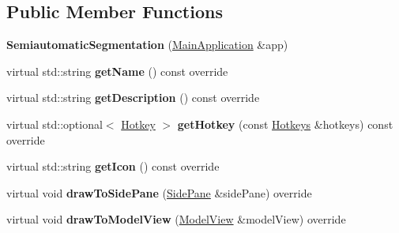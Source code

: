 \subsection*{Public Member Functions}
\begin{DoxyCompactItemize}
\item 
\mbox{\label{classpepr3d_1_1_semiautomatic_segmentation_ac17cad75cd7d333414c0d5db567026d6}} 
{\bfseries Semiautomatic\+Segmentation} (\mbox{\hyperlink{classpepr3d_1_1_main_application}{Main\+Application}} \&app)
\item 
\mbox{\label{classpepr3d_1_1_semiautomatic_segmentation_a2c30b8fe02de8112fc4295ba78d29077}} 
virtual std\+::string {\bfseries get\+Name} () const override
\item 
\mbox{\label{classpepr3d_1_1_semiautomatic_segmentation_a181a28ad82f889489264ad75e3d41e6e}} 
virtual std\+::string {\bfseries get\+Description} () const override
\item 
\mbox{\label{classpepr3d_1_1_semiautomatic_segmentation_ac660a9823195bf2d3df1066b177fc1d8}} 
virtual std\+::optional$<$ \mbox{\hyperlink{structpepr3d_1_1_hotkey}{Hotkey}} $>$ {\bfseries get\+Hotkey} (const \mbox{\hyperlink{classpepr3d_1_1_hotkeys}{Hotkeys}} \&hotkeys) const override
\item 
\mbox{\label{classpepr3d_1_1_semiautomatic_segmentation_aa3fb6ca454b5ef25a2efacc957fdaff8}} 
virtual std\+::string {\bfseries get\+Icon} () const override
\item 
\mbox{\label{classpepr3d_1_1_semiautomatic_segmentation_a74f11046c9fe827f6be119bd6306fa0f}} 
virtual void {\bfseries draw\+To\+Side\+Pane} (\mbox{\hyperlink{classpepr3d_1_1_side_pane}{Side\+Pane}} \&side\+Pane) override
\item 
\mbox{\label{classpepr3d_1_1_semiautomatic_segmentation_a138b0b37e305c4a8d0dd4b89d7303c50}} 
virtual void {\bfseries draw\+To\+Model\+View} (\mbox{\hyperlink{classpepr3d_1_1_model_view}{Model\+View}} \&model\+View) override

\end{DoxyCompactItemize}
